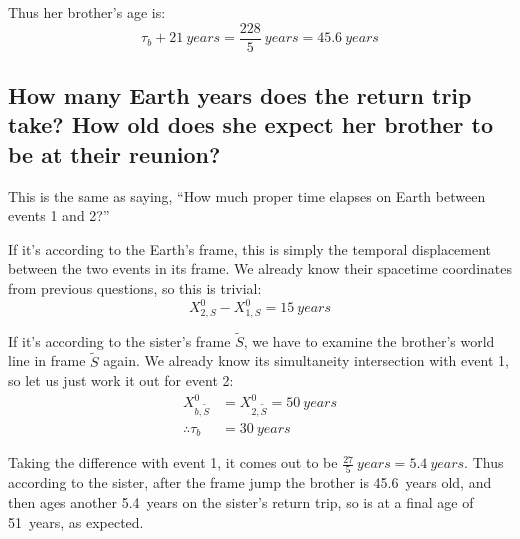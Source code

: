 \documentclass[a4paper]{scrartcl}
\begin{document}
Thus her brother's age is:
\[\tau_b + \SI{21}{years} = \frac{228}{5} \:\si{years} = \SI{45.6}{years}\]

\subsection{How many Earth years does the return trip take? How old does she expect her brother to be at their reunion?}
This is the same as saying, ``How much proper time elapses on Earth between events 1 and 2?''

If it's according to the Earth's frame, this is simply the temporal displacement between the two events in its frame. We already know their spacetime coordinates from previous questions, so this is trivial:
\[X^0_{2, S} - X^0_{1, S} = \SI{15}{years}\]

If it's according to the sister's frame \(\tilde{S}\), we have to examine the brother's world line in frame \(\tilde{S}\) again. We already know its simultaneity intersection with event 1, so let us just work it out for event 2:
\begin{align*}
    X^0_{b, \tilde{S}} &= X^0_{2, \tilde{S}} = \SI{50}{years} \\
    \therefore \tau_b &= \SI{30}{years}
\end{align*}

Taking the difference with event 1, it comes out to be \(\frac{27}{5} \:\si{years} = \SI{5.4}{years}\). Thus according to the sister, after the frame jump the brother is \SI{45.6}{years} old, and then ages another \SI{5.4}{years} on the sister's return trip, so is at a final age of \SI{51}{years}, as expected.
\end{document}
